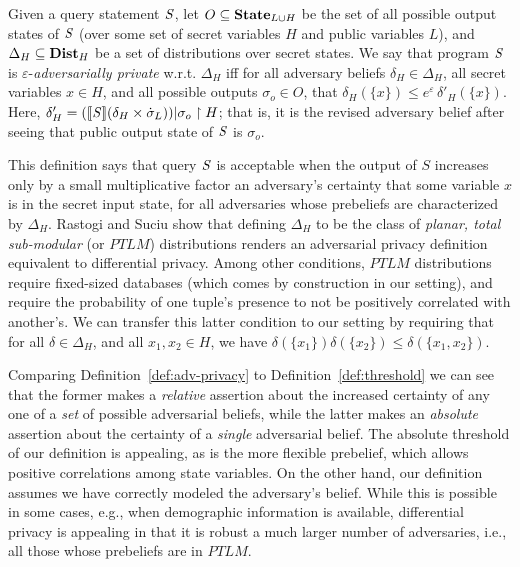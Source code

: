 \begin{definition}
\label{def:adv-privacy}
Given a query statement $\mathit{S}$, let $O \subseteq \textbf{State}_{L\cup H}$
be the set of all possible output states of $\mathit{S}$ (over some set of
secret variables $H$ and public variables $L$), and $\Delta_H \subseteq
\textbf{Dist}_H$ be a set of distributions over secret states.
%
We say that program $\mathit{S}$ is $\varepsilon$-\emph{adversarially
  private} w.r.t. $\Delta_H$ iff for all adversary beliefs $\delta_H
\in \Delta_H$, all secret variables $x \in H$, and all possible
outputs $\sigma_o \in O$, that $\delta_H(\{x\}) \leq e^{\varepsilon}\,
\delta'_H(\{x\})$.  Here, $\delta'_H =
([\![{\mathit{S}}]\!]{(\delta_H \times \dot{\sigma}_L)}) |
  \sigma_o \upharpoonright H$; that is, it is the revised adversary belief after
seeing that public output state of $\mathit{S}$ is $\sigma_o$.
\end{definition}

This definition says that query $\mathit{S}$ is acceptable when the output
of $S$ increases only by a small multiplicative factor an adversary's
certainty that some variable $x$ is in the secret input state, for all
adversaries whose prebeliefs are characterized by $\Delta_H$.  Rastogi
and Suciu show that defining $\Delta_H$ to be the class of
\emph{planar, total sub-modular} (or $PTLM$) distributions renders an
adversarial privacy definition equivalent to differential privacy.
Among other conditions, $PTLM$ distributions require fixed-sized
databases (which comes by construction in our setting), and require
the probability of one tuple's presence to not be positively
correlated with another's.  We can transfer this latter condition to
our setting by requiring that for all $\delta \in \Delta_H$, and all
$x_1,x_2 \in H$, we have $\delta(\{x_1\}) \delta(\{x_2\}) \leq
\delta(\{x_1,x_2\})$.

Comparing Definition~\ref{def:adv-privacy} to
Definition~\ref{def:threshold} we can see that the former makes a
\emph{relative} assertion about the increased certainty of any one of
a \emph{set} of possible adversarial beliefs, while the latter makes
an \emph{absolute} assertion about the certainty of a \emph{single}
adversarial belief.  The absolute threshold of our definition is
appealing, as is the more flexible prebelief, which allows positive
correlations among state variables.  On the other hand, our definition
assumes we have correctly modeled the adversary's belief.  While this
is possible in some cases, e.g., when demographic information is
available, differential privacy is appealing in that it is robust a
much larger number of adversaries, i.e., all those whose prebeliefs
are in $PTLM$.

